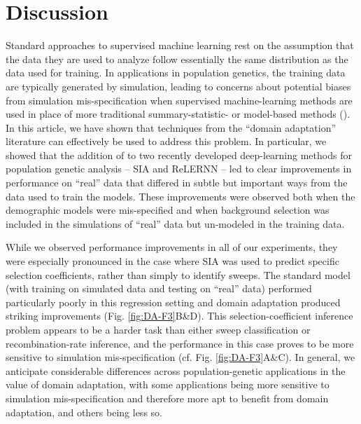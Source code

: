 \section{Discussion} \label{DA-discussion}
Standard approaches to supervised machine learning rest on the assumption that the data they are used to analyze follow essentially the same distribution as the data used for training. In applications in population genetics, the training data are typically generated by simulation, leading to concerns about potential biases from simulation mis-specification when supervised machine-learning methods are used in place of more traditional summary-statistic- or model-based methods (\cite{caldas_inference_2022,korfmann_deep_2023}). In this article, we have shown that techniques from the “domain adaptation” literature can effectively be used to address this problem. In particular, we showed that the addition of  to two recently developed deep-learning methods for population genetic analysis -- \ac{SIA} and ReLERNN -- led to clear improvements in performance on “real” data that differed in subtle but important ways from the data used to train the models. These improvements were observed both when the demographic models were mis-specified and when background selection was included in the simulations of “real” data but un-modeled in the training data.

While we observed performance improvements in all of our experiments, they were especially pronounced in the case where \ac{SIA} was used to predict specific selection coefficients, rather than simply to identify sweeps. The standard model (with training on simulated data and testing on “real” data) performed particularly poorly in this regression setting and domain adaptation produced striking improvements (Fig. \ref{fig:DA-F3}B\&D). This selection-coefficient inference problem appears to be a harder task than either sweep classification or recombination-rate inference, and the performance in this case proves to be more sensitive to simulation mis-specification (cf. Fig. \ref{fig:DA-F3}A\&C). In general, we anticipate considerable differences across population-genetic applications in the value of domain adaptation, with some applications being more sensitive to simulation mis-specification and therefore more apt to benefit from domain adaptation, and others being less so.

